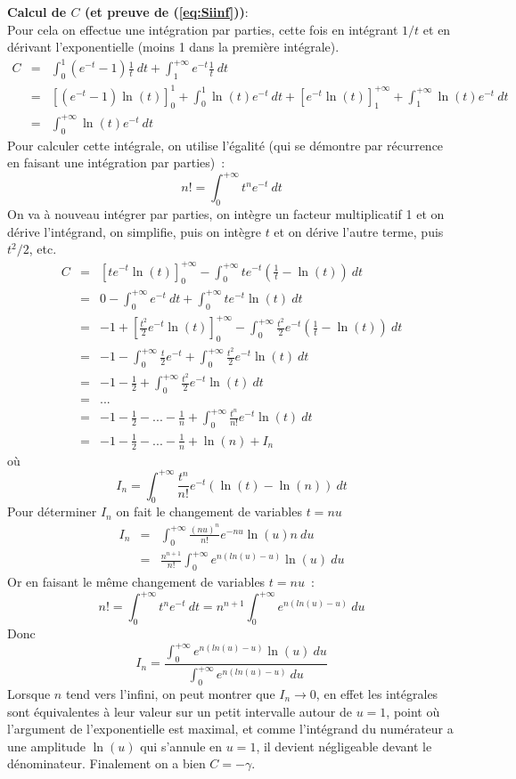 \documentclass[a4paper,11pt]{article}
\begin{document}
\begin{giacjshere}
{\bf Calcul de $C$ (et preuve de (\ref{eq:Siinf}))}:\\
Pour cela on effectue une intégration par parties, cette fois en intégrant $1/t$
et en dérivant l'exponentielle (moins 1 dans la première intégrale).
\begin{eqnarray*}
 C&=&\int_0^{1}(e^{-t}-1)\frac{1}{t} \ dt + \int_1^{+\infty} e^{-t} \frac{1}{t} \ dt\\
&=&[(e^{-t}-1)\ln(t)]_0^1 +\int_0^1 \ln(t) e^{-t} \ dt + [e^{-t} \ln(t)]_1^{+\infty}
+\int_1^{+\infty} \ln(t) e^{-t} \ dt \\
&=& \int_0^{+\infty} \ln(t) e^{-t} \ dt
\end{eqnarray*}
Pour calculer cette intégrale, on utilise
l'égalité (qui se démontre par récurrence en faisant une 
intégration par parties)~:
\[ n!= \int_0^{+\infty}t^n e^{-t} \ dt \]
On va à nouveau intégrer par parties,
on intègre un facteur multiplicatif 1 
et on dérive l'intégrand, on simplifie, puis
on intègre $t$ et on dérive l'autre terme, puis $t^2/2$, etc. 
\begin{eqnarray*}
 C&=&[te^{-t} \ln(t)]_0^{+\infty} - \int_0^{+\infty} t e^{-t}(\frac{1}{t}-\ln(t)) \ dt \\
&=& 0 - \int_0^{+\infty} e^{-t} \ dt + \int_0^{+\infty} t e^{-t} \ln(t) \ dt \\
&=& -1 + [\frac{t^2}{2}e^{-t} \ln(t)]_0^{+\infty} 
- \int_0^{+\infty} \frac{t^2}{2} e^{-t}(\frac{1}{t}-\ln(t)) \ dt \\
&=& -1 - \int_0^{+\infty} \frac{t}{2} e^{-t} +  \int_0^{+\infty} \frac{t^2}{2} e^{-t} \ln(t) \ dt \\
&=& -1 - \frac{1}{2} +  \int_0^{+\infty} \frac{t^2}{2} e^{-t} \ln(t) \ dt \\
&=& ...\\
&=& -1 - \frac{1}{2} - ... -  \frac{1}{n} + \int_0^{+\infty} \frac{t^n}{n!} e^{-t} \ln(t) \ dt \\
&=& -1 - \frac{1}{2} - ... -  \frac{1}{n} + \ln(n) + I_n
\end{eqnarray*}
où
\[ I_n=\int_0^{+\infty} \frac{t^n}{n!} e^{-t} (\ln(t)-\ln(n)) \ dt \]
Pour déterminer $I_n$ on fait le changement de variables $t=nu$
\begin{eqnarray*}
 I_n&=&\int_0^{+\infty} \frac{(nu)^n}{n!} e^{-nu} \ln(u) n\ du \\
&=& \frac{n^{n+1}}{n!} \int_0^{+\infty} e^{n(ln(u)-u)} \ln(u) \ du 
\end{eqnarray*}
Or en faisant le même changement de variables $t=nu$~:
\[ n!= \int_0^{+\infty}t^n e^{-t} \ dt = n^{n+1} \int_0^{+\infty} e^{n(ln(u)-u)} \ du
\]
Donc
\[ I_n= \frac{\int_0^{+\infty} e^{n(ln(u)-u)} \ln(u) \ du}
{\int_0^{+\infty} e^{n(ln(u)-u)} \ du}  \]
Lorsque $n$ tend vers l'infini, on peut montrer que $I_n \rightarrow 0$, en effet les intégrales
sont équivalentes à leur valeur sur un petit intervalle autour de $u=1$, point où l'argument
de l'exponentielle est maximal, 
et comme l'intégrand du numérateur a une amplitude $\ln(u)$ qui s'annule en $u=1$, 
il devient négligeable devant le dénominateur. Finalement on a bien $C=-\gamma$.


\end{giacjshere}
\end{document}
